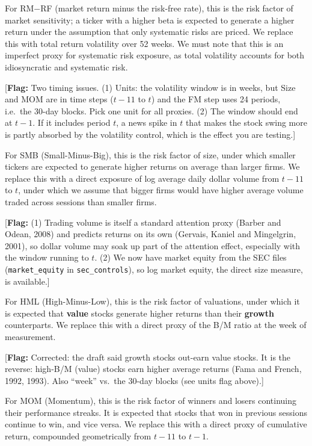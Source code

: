 \documentclass[11pt]{article}
\newcommand{\flag}[1]{{\color{red!75!black}\small [\textbf{Flag:} #1]}}
\begin{document}
For RM$-$RF (market return minus the risk-free rate), this is the risk factor of market sensitivity; a ticker with a higher beta is expected to generate a higher return under the assumption that only systematic risks are priced. We replace this with total return volatility over 52 weeks. We must note that this is an imperfect proxy for systematic risk exposure, as total volatility accounts for both idiosyncratic and systematic risk.

\flag{Two timing issues. (1) Units: the volatility window is in weeks, but Size and MOM are in time steps ($t-11$ to $t$) and the FM step uses 24 periods, i.e.\ the 30-day blocks. Pick one unit for all proxies. (2) The window should end at $t-1$. If it includes period $t$, a news spike in $t$ that makes the stock swing more is partly absorbed by the volatility control, which is the effect you are testing.}

For SMB (Small-Minus-Big), this is the risk factor of size, under which smaller tickers are expected to generate higher returns on average than larger firms. We replace this with a direct exposure of log average daily dollar volume from $t-11$ to $t$, under which we assume that bigger firms would have higher average volume traded across sessions than smaller firms.

\flag{(1) Trading volume is itself a standard attention proxy (Barber and Odean, 2008) and predicts returns on its own (Gervais, Kaniel and Mingelgrin, 2001), so dollar volume may soak up part of the attention effect, especially with the window running to $t$. (2) We now have market equity from the SEC files (\texttt{market\_equity} in \texttt{sec\_controls}), so log market equity, the direct size measure, is available.}

For HML (High-Minus-Low), this is the risk factor of valuations, under which it is expected that \textbf{value} stocks generate higher returns than their \textbf{growth} counterparts. We replace this with a direct proxy of the B/M ratio at the week of measurement.

\flag{Corrected: the draft said growth stocks out-earn value stocks. It is the reverse: high-B/M (value) stocks earn higher average returns (Fama and French, 1992, 1993). Also ``week'' vs.\ the 30-day blocks (see units flag above).}

For MOM (Momentum), this is the risk factor of winners and losers continuing their performance streaks. It is expected that stocks that won in previous sessions continue to win, and vice versa. We replace this with a direct proxy of cumulative return, compounded geometrically from $t-11$ to $t-1$.
\end{document}
